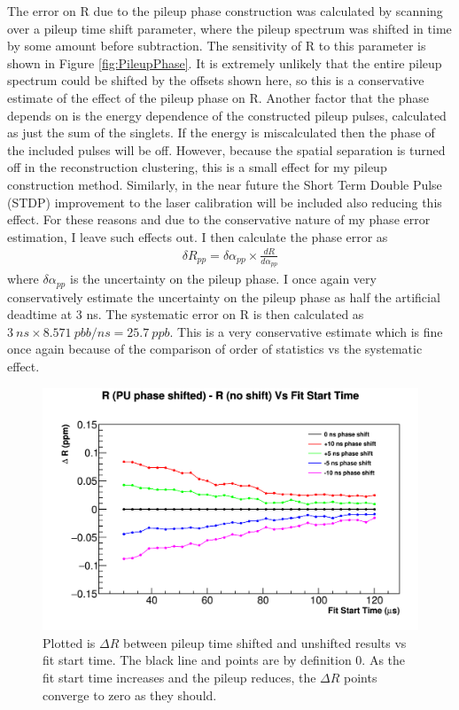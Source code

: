 	The error on R due to the pileup phase construction was calculated by scanning over a pileup time shift parameter, where the pileup spectrum was shifted in time by some amount before subtraction. The sensitivity of R to this parameter is shown in Figure \ref{fig:PileupPhase}. It is extremely unlikely that the entire pileup spectrum could be shifted by the offsets shown here, so this is a conservative estimate of the effect of the pileup phase on R. Another factor that the phase depends on is the energy dependence of the constructed pileup pulses, calculated as just the sum of the singlets. If the energy is miscalculated then the phase of the included pulses will be off. However, because the spatial separation is turned off in the reconstruction clustering, this is a small effect for my pileup construction method. Similarly, in the near future the Short Term Double Pulse (STDP) improvement to the laser calibration will be included also reducing this effect. For these reasons and due to the conservative nature of my phase error estimation, I leave such effects out. I then calculate the phase error as 
		\begin{align}
			\delta R_{pp} = \delta\alpha_{pp} \times \frac{dR}{d\alpha_{pp}}
		\end{align}
	where $\delta\alpha_{pp}$ is the uncertainty on the pileup phase. I once again very conservatively estimate the uncertainty on the pileup phase as half the artificial deadtime at 3 ns. The systematic error on R is then calculated as $\SI{3}{ns} \times \SI{8.571}{pbb/ns} = \SI{25.7}{ppb}$. This is a very conservative estimate which is fine once again because of the comparison of order of statistics vs the systematic effect.

	\begin{figure}[]
		\centering
		\includegraphics[width=.8\textwidth]{pileupTimeShiftComparison}
	    \caption[PileupTimeShiftFS]{Plotted is $\Delta R$ between pileup time shifted and unshifted results vs fit start time. The black line and points are by definition 0. As the fit start time increases and the pileup reduces, the $\Delta R$ points converge to zero as they should.}
	    \label{fig:PileupTimeShiftFS}
	\end{figure}


